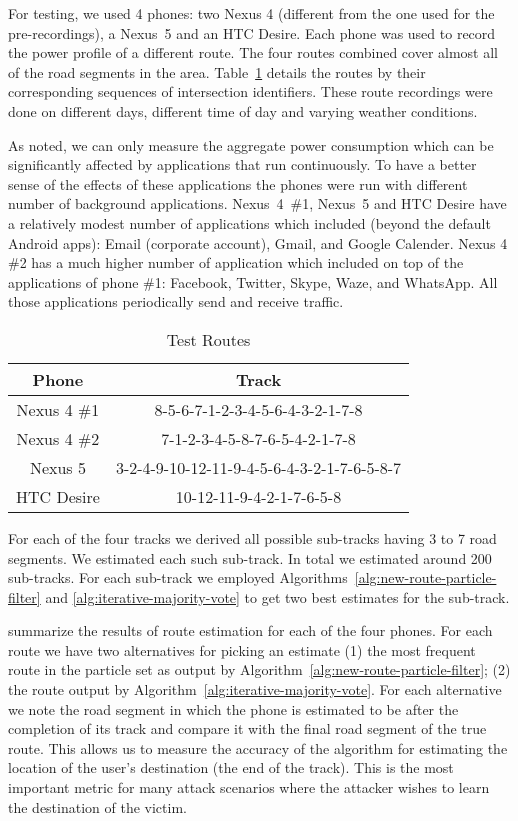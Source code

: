 For testing, we used 4 phones: two Nexus 4 (different from the one used for the pre-recordings), a \mbox{Nexus 5} and an HTC Desire.
Each phone was used to record the power profile of a different route.
The four routes combined cover almost all of the road segments in the area.
Table~\ref{tab:TestRoutes} details the routes by their corresponding sequences of intersection identifiers. 
These route recordings were done on different days, different time of day and varying weather conditions.

As noted, we can only measure the aggregate power consumption which can be significantly affected by applications that run continuously. 
To have a better sense of the effects of these applications the phones were run with different number of background applications. \mbox{Nexus 4 \#1}, 
\mbox{Nexus 5} and HTC Desire have a relatively modest number of applications which included (beyond the default Android apps): Email (corporate account), Gmail, and Google Calender. Nexus 4 \#2 has a much higher number of application which included on top of the applications of phone \#1: Facebook, Twitter, Skype, Waze, and WhatsApp. All those applications periodically send and receive traffic.

\begin{table}
	\centering
	\small
	\begin{tabular}{|c|c|}
		\hline
		Phone & Track \\
		\hline
		Nexus 4 \#1 & 8-5-6-7-1-2-3-4-5-6-4-3-2-1-7-8\\
		\hline
		Nexus 4 \#2 & 7-1-2-3-4-5-8-7-6-5-4-2-1-7-8\\
		\hline
		Nexus 5 & 3-2-4-9-10-12-11-9-4-5-6-4-3-2-1-7-6-5-8-7\\
		\hline
		HTC Desire & 10-12-11-9-4-2-1-7-6-5-8\\
    \hline
	\end{tabular}
	\normalsize
	\caption{Test Routes}
	\label{tab:TestRoutes}
\end{table}

For each of the four tracks we derived all possible sub-tracks having 3 to 7 road segments. We estimated each such sub-track.
In total we estimated around 200 sub-tracks. For each sub-track we
employed Algorithms~\ref{alg:new-route-particle-filter} and \ref{alg:iterative-majority-vote} to get two best
estimates for the sub-track.

 summarize the results of route estimation for each of
the four phones. For each route we have two alternatives for picking an estimate (1) the most frequent route in
the particle set as output by Algorithm~\ref{alg:new-route-particle-filter}; (2) the route output by Algorithm~\ref{alg:iterative-majority-vote}.
For each alternative we note the road segment in which the phone is estimated to be after the completion of its track and compare it with the final road segment of the true route. This allows us to measure the accuracy of the algorithm for estimating the location of the user's destination (the end of the track). This is the most important metric for many attack scenarios where the attacker wishes to learn the destination of the victim.

